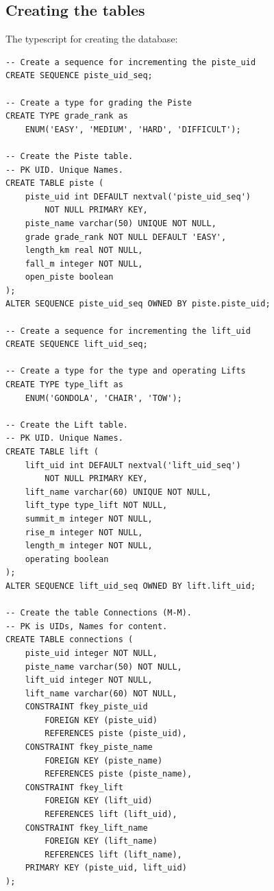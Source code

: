 \documentclass[11pt]{scrartcl} %
\begin{document}
\subsection{Creating the tables}
The typescript for creating the database:

\begin{lstlisting}
-- Create a sequence for incrementing the piste_uid
CREATE SEQUENCE piste_uid_seq;

-- Create a type for grading the Piste
CREATE TYPE grade_rank as 
	ENUM('EASY', 'MEDIUM', 'HARD', 'DIFFICULT');

-- Create the Piste table. 
-- PK UID. Unique Names.
CREATE TABLE piste (
	piste_uid int DEFAULT nextval('piste_uid_seq')
		NOT NULL PRIMARY KEY,
	piste_name varchar(50) UNIQUE NOT NULL,
	grade grade_rank NOT NULL DEFAULT 'EASY',
	length_km real NOT NULL,
	fall_m integer NOT NULL,
	open_piste boolean
);
ALTER SEQUENCE piste_uid_seq OWNED BY piste.piste_uid;
	
-- Create a sequence for incrementing the lift_uid	
CREATE SEQUENCE lift_uid_seq;

-- Create a type for the type and operating Lifts
CREATE TYPE type_lift as
	ENUM('GONDOLA', 'CHAIR', 'TOW');
	
-- Create the Lift table.
-- PK UID. Unique Names.
CREATE TABLE lift (
	lift_uid int DEFAULT nextval('lift_uid_seq')
		NOT NULL PRIMARY KEY,
	lift_name varchar(60) UNIQUE NOT NULL,
	lift_type type_lift NOT NULL,
	summit_m integer NOT NULL,
	rise_m integer NOT NULL,
	length_m integer NOT NULL,
	operating boolean
);
ALTER SEQUENCE lift_uid_seq OWNED BY lift.lift_uid;

-- Create the table Connections (M-M). 
-- PK is UIDs, Names for content.
CREATE TABLE connections (
	piste_uid integer NOT NULL,
	piste_name varchar(50) NOT NULL,
	lift_uid integer NOT NULL,
	lift_name varchar(60) NOT NULL,
	CONSTRAINT fkey_piste_uid
		FOREIGN KEY (piste_uid)
		REFERENCES piste (piste_uid),
	CONSTRAINT fkey_piste_name
		FOREIGN KEY (piste_name)
		REFERENCES piste (piste_name),
	CONSTRAINT fkey_lift
		FOREIGN KEY (lift_uid)
		REFERENCES lift (lift_uid),
	CONSTRAINT fkey_lift_name
		FOREIGN KEY (lift_name)
		REFERENCES lift (lift_name),
	PRIMARY KEY (piste_uid, lift_uid)
);
\end{lstlisting}
\end{document}
